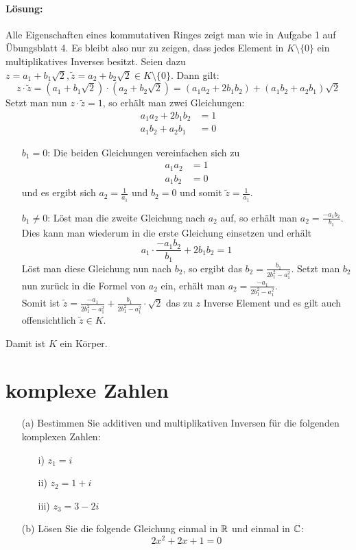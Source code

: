 \documentclass[
				a4paper,
				10pt
			]
			{scrartcl}
\begin{document}
\paragraph{L\"osung:} 
Alle Eigenschaften eines kommutativen Ringes zeigt man wie in Aufgabe 1 auf  \"Ubungsblatt 4. Es bleibt also nur zu zeigen, dass jedes Element in $K \setminus \{0\}$ ein multiplikatives Inverses besitzt. Seien dazu $z=a_1 + b_1 \sqrt{2}, \tilde z=a_2+b_2\sqrt{2} \in K\setminus \{0\}$. Dann gilt:
$$
z \cdot \tilde z =(a_1 + b_1\sqrt{2}) \cdot (a_2 + b_2\sqrt{2}) = (a_1a_2 + 2b_1b_2) + (a_1b_2 + a_2b_1)\sqrt{2}
$$
Setzt man nun $z \cdot \tilde z=1$, so erh\"alt man zwei Gleichungen:
\begin{align*}
a_1a_2 + 2b_1b_2&=1\\
a_1b_2 + a_2b_1&=0
\end{align*}
\begin{itemize}
\item[$b_1=0$:]
Die beiden Gleichungen vereinfachen sich zu 
\begin{align*}
a_1a_2 &=1\\
a_1b_2&=0
\end{align*}
und es ergibt sich $a_2=\frac{1}{a_1}$ und $b_2=0$ und somit $\tilde z = \frac{1}{a_1}$.
\item[$b_1\ne 0$:]
L\"ost man die zweite Gleichung nach $a_2$ auf, so erh\"alt man $a_2=\frac{-a_1b_2}{b_1}$. Dies kann man wiederum in die erste Gleichung einsetzen und erh\"alt
$$
a_1\cdot \frac{-a_1b_2}{b_1} + 2b_1b_2=1
$$
L\"ost man diese Gleichung nun nach $b_2$, so ergibt das $b_2=\frac{b_1}{2b_1^2-a_1^2}$. Setzt man $b_2$ nun zur\"uck in die Formel von $a_2$ ein, erh\"alt man $a_2=\frac{-a_1}{2b_1^2-a_1^2}$.\\
Somit ist $\tilde z=\frac{-a_1}{2b_1^2-a_1^2} + \frac{b_1}{2b_1^2-a_1^2} \cdot \sqrt{2}$ das zu $z$ Inverse Element und es gilt auch offensichtlich $\tilde z \in K$. 
\end{itemize}
Damit ist $K$ ein K\"orper.



\section{komplexe Zahlen}

\begin{itemize}
\item[(a)] Bestimmen Sie additiven und multiplikativen Inversen f\"ur die folgenden komplexen Zahlen:
\begin{itemize}
\item[i)] $z_1=i$
\item[ii)] $z_2=1+i$
\item[iii)] $z_3=3-2i$
\end{itemize}

\item[(b)] L\"osen Sie die folgende Gleichung einmal in $\mathbb{R}$ und einmal in $\mathbb{C}$:
$$
2x^2+2x+1=0
$$
\end{itemize}
\end{document}

